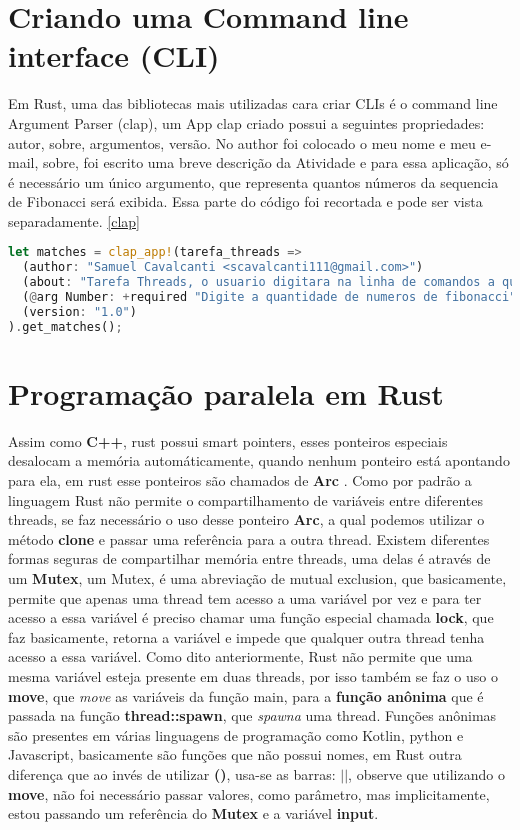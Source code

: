 \documentclass{article}
\begin{document}
\section*{Criando uma Command line interface (CLI) }
Em Rust, uma das bibliotecas mais utilizadas cara criar CLIs é o command line Argument Parser (clap), um App clap
criado possui a seguintes propriedades: autor, sobre, argumentos, versão. No author foi colocado o meu nome e meu e-mail,
sobre, foi escrito uma breve descrição da Atividade e para essa aplicação, só é necessário um único argumento, que 
representa quantos números da sequencia de Fibonacci será exibida. Essa parte do código foi recortada e pode ser vista
separadamente. \ref{clap}
\begin{lstlisting}[language=Rust, label=clap, caption=CLAP , style=customRust]
  let matches = clap_app!(tarefa_threads =>
  (author: "Samuel Cavalcanti <scavalcanti111@gmail.com>")
  (about: "Tarefa Threads, o usuario digitara na linha de comandos a quantidade de numeros de Fibonacci que o programa deve gerar")
  (@arg Number: +required "Digite a quantidade de numeros de fibonacci")
  (version: "1.0")
).get_matches();
  \end{lstlisting}

  \newpage

\section*{Programação paralela em Rust}

  Assim como \textbf{C++}, rust possui smart pointers, esses ponteiros especiais desalocam a memória automáticamente, quando nenhum ponteiro está apontando para ela,
  em rust esse ponteiros são chamados de \textbf{Arc} \cite{klabnik2019rust}. Como por padrão a linguagem Rust não permite o compartilhamento de variáveis entre diferentes threads,
  se faz necessário o uso desse ponteiro \textbf{Arc}, a qual podemos utilizar o método \textbf{clone} e passar uma referência para a outra thread. Existem diferentes
  formas seguras de compartilhar memória entre threads, uma delas é através de um \textbf{Mutex}, um Mutex, é uma abreviação de mutual exclusion, que basicamente, permite
  que apenas uma thread tem acesso a uma variável por vez e para ter acesso a essa variável é preciso chamar uma função especial chamada \textbf{lock}, que faz basicamente,
  retorna a variável e impede que qualquer outra thread tenha acesso a essa variável. Como dito anteriormente, Rust não permite que uma mesma variável esteja presente em
  duas threads, por isso também se faz o uso o \textbf{move}, que \textit{move} as variáveis da função main, para a \textbf{função anônima} que é passada na função \textbf{thread::spawn},
  que  \textit{spawna} uma thread. Funções anônimas são presentes em várias linguagens de programação como Kotlin, python e Javascript, basicamente são funções que não
  possui nomes, em Rust outra diferença que ao invés de utilizar \textbf{()}, usa-se as barras: $||$, observe que utilizando o \textbf{move}, não foi necessário passar
  valores, como parâmetro, mas implicitamente, estou passando um referência do \textbf{Mutex} e a variável \textbf{input}.
\end{document}
